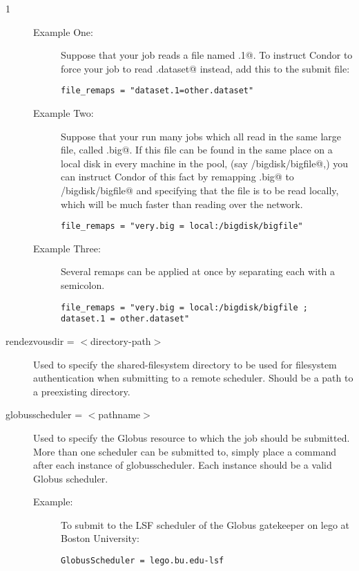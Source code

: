 \begin{ManPage}{\label{man-condor-submit}}{1}
\begin{description}
\begin{description}
\item[Example One:]
Suppose that your job reads a file named \verb@dataset.1@.  To instruct Condor
to force your job to read \verb@other.dataset@ instead, 
add this to the submit file:
\begin{verbatim}
file_remaps = "dataset.1=other.dataset"
\end{verbatim}
\item[Example Two:]
Suppose that your run many jobs which all read in the same large file,
called \verb@very.big@.  If this file can be found in the same place on
a local disk in every machine in the pool,
(say \verb@/bigdisk/bigfile@,) you can
instruct Condor of this fact by remapping \verb@very.big@ to
\verb@/bigdisk/bigfile@ and specifying that the file is to be read locally,
which will be much faster than reading over the network.
\begin{verbatim}
file_remaps = "very.big = local:/bigdisk/bigfile"
\end{verbatim}
\item[Example Three:]
Several remaps can be applied at once by separating each with a semicolon.
\begin{verbatim}
file_remaps = "very.big = local:/bigdisk/bigfile ; dataset.1 = other.dataset"
\end{verbatim}
\end{description}


\item[rendezvousdir = $<$directory-path$>$] Used to specify the 
shared-filesystem directory to be used for filesystem authentication
when submitting to a remote scheduler.  Should be a path to a preexisting 
directory.  


\item[globusscheduler = $<$pathname$>$] Used to specify the 
Globus resource to which the job should be submitted. More than one scheduler
can be submitted to, simply place a  command after each instance
of globusscheduler. Each instance should be a valid Globus scheduler.
\begin{description}
\item[Example:]
To submit to the LSF scheduler of the Globus gatekeeper on lego at 
Boston University:
\begin{verbatim}
GlobusScheduler = lego.bu.edu-lsf
\end{verbatim}
\end{description}


\end{description}
\end{ManPage}
